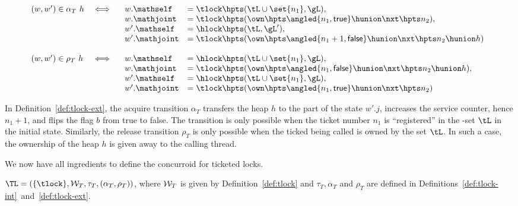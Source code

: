 \begin{definition}
\label{def:tlock-ext}

\[
\begin{array}[t]{lcl}
(w, w') \in \alpha_T~h & \iff & 
\begin{array}[t]{ll}
w.\mathself & = \tlock \hpts (\tL \cup \set{n_1}, \gL), \\
w.\mathjoint & = \tlock \hpts (\own \hpts \angled{n_1, \mathsf{true}} \hunion \nxt
\hpts n_2), \\
w'.\mathself & = \hlock \hpts (\tL, \gL'), \\
w'.\mathjoint & = \tlock \hpts (\own \hpts \angled{n_1 + 1, \mathsf{false}} \hunion \nxt
\hpts n_2 \hunion h)
\end{array}
\\ \\
(w, w') \in \rho_T~h & \iff & 
\begin{array}[t]{ll}
w.\mathself & = \hlock \hpts (\tL \cup \set{n_1}, \gL), \\
w.\mathjoint & = \tlock \hpts (\own \hpts \angled{n_1, \mathsf{false}} \hunion \nxt
\hpts n_2 \hunion h),
 \\
w'.\mathself & = \hlock \hpts (\tL \cup \set{n_1}, \gL), \\
w'.\mathjoint & = \tlock \hpts (\own \hpts \angled{n_1, \mathsf{true}} \hunion \nxt
\hpts n_2)
\end{array}
\end{array}
\]

\end{definition}

In Definition~\ref{def:tlock-ext}, the acquire transition $\alpha_T$
transfers the heap $h$ to the \joint part of the state $w'.j$,
increases the service counter, hence $n_1 + 1$, and flips the flag $b$
from \textsf{true} to \textsf{false}. The transition is only possible
when the ticket number $n_1$ is ``registered'' in the \self-set $\tL$
in the initial state. Similarly, the release transition $\rho_T$ is
only possible when the ticked being called is owned by the \self set
$\tL$. In such a case, the ownership of the heap $h$ is given away to
the calling thread.

We now have all ingredients to define the concurroid for ticketed
locks.

\begin{definition}

  $\TL = (\{\tlock\}, {\cal W}_T, \tau_T, (\alpha_T, \rho_T))$, where
  ${\cal W}_T$ is given by Definition~\ref{def:tlock} and $\tau_T,
  \alpha_T$ and $\rho_T$ are
  defined in Definitions~\ref{def:tlock-int}~and~\ref{def:tlock-ext}.
\end{definition}


